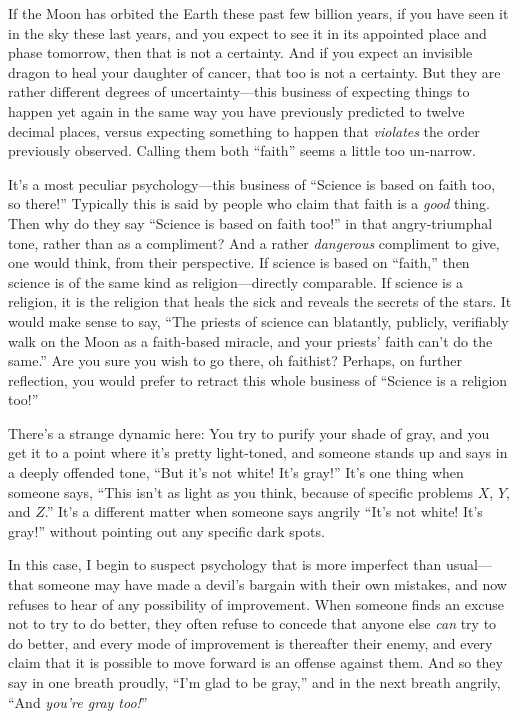 {
 If the Moon has orbited the Earth these past few billion years, if
you have seen it in the sky these last years, and you expect to see it
in its appointed place and phase tomorrow, then that is not a
certainty. And if you expect an invisible dragon to heal your daughter
of cancer, that too is not a certainty. But they are rather different
degrees of uncertainty---this business of expecting things to happen
yet again in the same way you have previously predicted to twelve
decimal places, versus expecting something to happen that
\textit{violates} the order previously observed. Calling them both
``faith'' seems a little too
un-narrow.}

{
 It's a most peculiar psychology---this business of
``Science is based on faith too, so
there!'' Typically this is said by people who claim
that faith is a \textit{good} thing. Then why do they say
``Science is based on faith too!''
in that angry-triumphal tone, rather than as a compliment? And a rather
\textit{dangerous} compliment to give, one would think, from their
perspective. If science is based on
``faith,'' then science is of the
same kind as religion---directly comparable. If science is a religion,
it is the religion that heals the sick and reveals the secrets of the
stars. It would make sense to say, ``The priests of
science can blatantly, publicly, verifiably walk on the Moon as a
faith-based miracle, and your priests' faith
can't do the same.'' Are you sure you
wish to go there, oh faithist? Perhaps, on further reflection, you
would prefer to retract this whole business of
``Science is a religion too!''}

{
 There's a strange dynamic here: You try to purify
your shade of gray, and you get it to a point where
it's pretty light-toned, and someone stands up and says
in a deeply offended tone, ``But it's
not white! It's gray!''
It's one thing when someone says,
``This isn't as light as you think,
because of specific problems $X$, $Y$, and $Z$.''
It's a different matter when someone says angrily
``It's not white! It's
gray!'' without pointing out any specific dark
spots.}

{
 In this case, I begin to suspect psychology that is more imperfect
than usual---that someone may have made a devil's
bargain with their own mistakes, and now refuses to hear of any
possibility of improvement. When someone finds an excuse not to try to
do better, they often refuse to concede that anyone else \textit{can}
try to do better, and every mode of improvement is thereafter their
enemy, and every claim that it is possible to move forward is an
offense against them. And so they say in one breath proudly,
``I'm glad to be
gray,'' and in the next breath angrily,
``And \textit{you're gray
too!}''}

